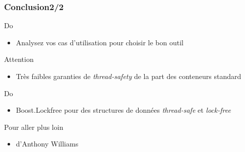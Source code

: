 \documentclass[C++.tex]{subfiles}
\begin{document}
\begin{frame}[fragile]
	\frametitle{Conclusion\titlehfill{}2/2}
	\begin{exampleblock}{Do}
		\begin{itemize}
			\item Analysez vos cas d'utilisation pour choisir le bon outil
		\end{itemize}
	\end{exampleblock}

	\begin{alertblock}{Attention}
		\begin{itemize}
			\item Très faibles garanties de \textit{thread-safety} de la part des conteneurs standard
		\end{itemize}

	\end{alertblock}

	\begin{exampleblock}{Do}
		\begin{itemize}
			\item Boost.Lockfree pour des structures de données \textit{thread-safe} et \textit{lock-free}
		\end{itemize}
	\end{exampleblock}

	\begin{block}{Pour aller plus loin}
		\begin{itemize}
			\item \cite{ConcInAction} d'Anthony Williams
		\end{itemize}

	\end{block}
\end{frame}
\end{document}
